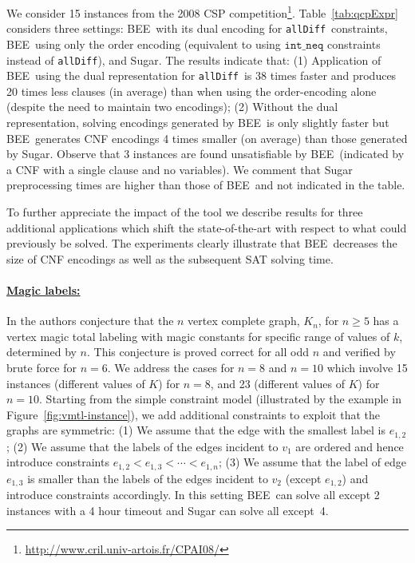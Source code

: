 \documentclass{tlp}
\newcommand{\allDifferent}{\texttt{allDiff}}
\newcommand{\bee}{\textsf{BEE}}
\begin{document}
We consider 15 instances from the 2008 CSP
competition\footnote{\url{http://www.cril.univ-artois.fr/CPAI08/}}.
Table~\ref{tab:qcpExpr} considers three settings: \bee\ with its dual
encoding for \allDifferent\ constraints, \bee\ using only the order
encoding (equivalent to using $\mathtt{int\_neq}$ constraints instead of
\allDifferent), and Sugar. The results indicate that:
(1) Application of \bee\ using the dual representation for
\allDifferent\ is 38 times faster and produces 20 times less clauses
(in average) than when using the order-encoding alone (despite the
need to maintain two encodings);
(2) Without the dual representation, solving encodings generated by
\bee\ is only slightly faster but \bee\ generates CNF encodings 4
times smaller (on average) than those generated by Sugar.
Observe that 3 instances are found unsatisfiable by \bee\ (indicated
by a CNF with a single clause and no variables). We comment that Sugar
preprocessing times are higher than those of \bee\ and not indicated
in the table.



\bigskip To further appreciate the impact of the tool we describe
results for three additional applications which shift the
state-of-the-art with respect to what could previously be solved.
The experiments clearly illustrate that \bee\ decreases the size of
CNF encodings as well as the subsequent SAT solving time.

\vspace{-3mm}
\paragraph{\underline{Magic labels:}}
In \cite{MacDougall2002} the authors conjecture that the $n$ vertex
complete graph, $K_n$, for $n\geq 5$ has a vertex magic total labeling
with magic constants for specific range of values of $k$, determined
by $n$. This conjecture is proved correct for all odd $n$ and verified
by brute force for $n=6$.
We address the cases for $n=8$ and $n=10$ which involve 15 instances
(different values of $K$) for $n=8$, and 23 (different values of $K$)
for $n=10$. Starting from the simple constraint model (illustrated by
the example in Figure~\ref{fig:vmtl-instance}), we add additional
constraints to exploit that the graphs are symmetric:
(1) We assume that the edge with the smallest label is $e_{1,2}$; 
(2) We assume that the labels of the edges incident to $v_1$ are
ordered and hence introduce constraints $e_{1,2} < e_{1,3} < \cdots <
e_{1,n}$; 
(3) We assume that the label of edge $e_{1,3}$ is smaller than the
labels of the edges incident to $v_2$ (except $e_{1,2}$) and introduce
constraints accordingly.
In this setting \bee\ can solve all except 2 instances with a 4 hour
timeout and Sugar can solve all except~4.
\end{document}
